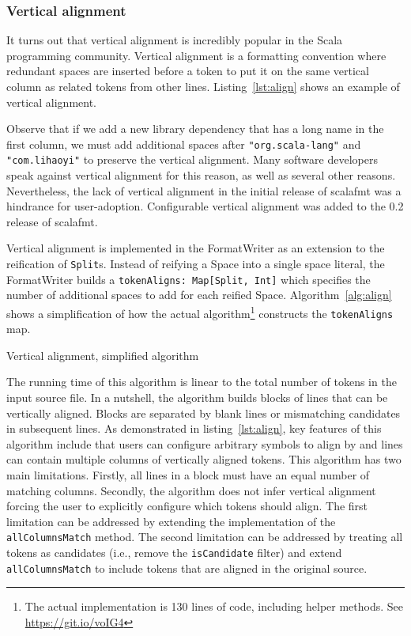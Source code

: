 \subsubsection{Vertical alignment}
It turns out that vertical alignment is incredibly popular in the Scala programming community.
Vertical alignment is a formatting convention where redundant spaces are inserted before a token to put it on the same vertical column as related tokens from other lines.
Listing~\ref{lst:align} shows an example of vertical alignment.
\begin{minipage}{\linewidth}
  
\end{minipage}
Observe that if we add a new library dependency that has a long name in the first column, we must add additional spaces after \texttt{"org.scala-lang"} and \texttt{"com.lihaoyi"} to preserve the vertical alignment.
Many software developers speak against vertical alignment for this reason, as well as several other reasons.
Nevertheless, the lack of vertical alignment in the initial release of scalafmt was a hindrance for user-adoption.
Configurable vertical alignment was added to the 0.2 release of scalafmt.

Vertical alignment is implemented in the FormatWriter as an extension to the reification of \texttt{Split}s.
Instead of reifying a Space into a single space literal,
the FormatWriter builds a \texttt{tokenAligns: Map[Split, Int]} which specifies the number of additional spaces to add for each reified Space.
Algorithm~\ref{alg:align} shows a simplification of how the actual algorithm\footnote{
  The actual implementation is 130 lines of code, including helper methods. See
\href{https://git.io/voIG4}{https://git.io/voIG4}}
constructs the \texttt{tokenAligns} map.
\begin{algorithm}
  \caption{Vertical alignment, simplified algorithm}\label{alg:align}
  
\end{algorithm}
The running time of this algorithm is linear to the total number of tokens in the input source file.
In a nutshell, the algorithm builds blocks of lines that can be vertically aligned.
Blocks are separated by blank lines or mismatching candidates in subsequent lines.
As demonstrated in listing~\ref{lst:align}, key features of this algorithm include that users can configure arbitrary symbols to align by and lines can contain multiple columns of vertically aligned tokens.
This algorithm has two main limitations.
Firstly, all lines in a block must have an equal number of matching columns.
Secondly, the algorithm does not infer vertical alignment forcing the user to explicitly configure which tokens should align.
The first limitation can be addressed by extending the implementation of the \texttt{allColumnsMatch} method.
The second limitation can be addressed by treating all tokens as candidates (i.e., remove the \texttt{isCandidate} filter) and extend \texttt{allColumnsMatch} to include tokens that are aligned in the original source.

